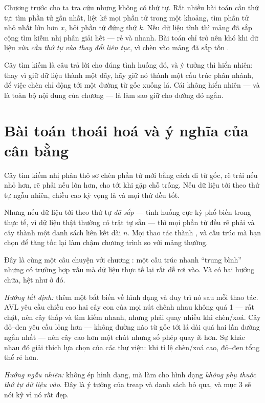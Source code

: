 \documentclass[../../algorithm.tex]{subfiles}
\begin{document}
Chương trước cho ta tra cứu  nhưng không có thứ tự. Rất nhiều bài toán cần thứ tự: tìm phần tử gần nhất, liệt kê mọi phần tử trong một khoảng, tìm phần tử nhỏ nhất lớn hơn \(x\), hỏi phần tử đứng thứ \(k\). Nếu dữ liệu tĩnh thì mảng đã sắp cộng tìm kiếm nhị phân giải hết --- rẻ và nhanh. Bài toán chỉ trở nên khó khi dữ liệu \emph{vừa cần thứ tự vừa thay đổi liên tục}, vì chèn vào mảng đã sắp tốn .

Cây tìm kiếm là câu trả lời cho đúng tình huống đó, và ý tưởng thì hiển nhiên: thay vì giữ dữ liệu thành một dãy, hãy giữ nó thành một cấu trúc phân nhánh, để việc chèn chỉ động tới một đường từ gốc xuống lá. Cái không hiển nhiên --- và là toàn bộ nội dung của chương --- là làm sao giữ cho đường đó ngắn.

\section{Bài toán thoái hoá và ý nghĩa của cân bằng}

Cây tìm kiếm nhị phân thô sơ chèn phần tử mới bằng cách đi từ gốc, rẽ trái nếu nhỏ hơn, rẽ phải nếu lớn hơn, cho tới khi gặp chỗ trống. Nếu dữ liệu tới theo thứ tự ngẫu nhiên, chiều cao kỳ vọng là  và mọi thứ đều tốt.

Nhưng nếu dữ liệu tới theo thứ tự \emph{đã sắp} --- tình huống cực kỳ phổ biến trong thực tế, vì dữ liệu thật thường có trật tự sẵn --- thì mọi phần tử đều rẽ phải và cây thành một danh sách liên kết dài \(n\). Mọi thao tác thành , và cấu trúc mà bạn chọn để tăng tốc lại làm chậm chương trình so với mảng thường.

Đây là cùng một câu chuyện với chương : một cấu trúc nhanh ``trung bình'' nhưng có trường hợp xấu mà dữ liệu thực tế lại rất dễ rơi vào. Và có hai hướng chữa, hệt như ở đó.

\emph{Hướng tất định:} thêm một bất biến về hình dạng và duy trì nó sau mỗi thao tác. AVL yêu cầu chiều cao hai cây con của mọi nút chênh nhau không quá 1 --- rất chặt, nên cây thấp và tìm kiếm nhanh, nhưng phải quay nhiều khi chèn/xoá. Cây đỏ--đen yêu cầu lỏng hơn --- không đường nào từ gốc tới lá dài quá hai lần đường ngắn nhất --- nên cây cao hơn một chút nhưng số phép quay ít hơn. Sự khác nhau đó giải thích lựa chọn của các thư viện: khi tỉ lệ chèn/xoá cao, đỏ--đen tổng thể rẻ hơn.

\emph{Hướng ngẫu nhiên:} không ép hình dạng, mà làm cho hình dạng \emph{không phụ thuộc thứ tự dữ liệu vào}. Đây là ý tưởng của treap và danh sách bỏ qua, và mục 3 sẽ nói kỹ vì nó rất đẹp.
\end{document}
